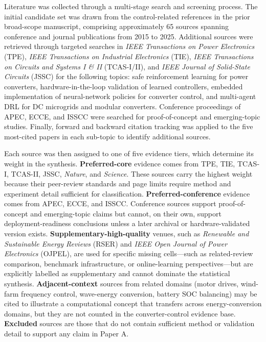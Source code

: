 \documentclass[manuscript,screen,review]{acmart}
\begin{document}
Literature was collected through a multi-stage search and screening process.
The initial candidate set was drawn from the control-related references in the prior broad-scope manuscript, comprising approximately 65 sources spanning conference and journal publications from 2015 to 2025.
Additional sources were retrieved through targeted searches in \emph{IEEE Transactions on Power Electronics} (TPE), \emph{IEEE Transactions on Industrial Electronics} (TIE), \emph{IEEE Transactions on Circuits and Systems I \& II} (TCAS-I/II), and \emph{IEEE Journal of Solid-State Circuits} (JSSC) for the following topics: safe reinforcement learning for power converters, hardware-in-the-loop validation of learned controllers, embedded implementation of neural-network policies for converter control, and multi-agent DRL for DC microgrids and modular converters.
Conference proceedings of APEC, ECCE, and ISSCC were searched for proof-of-concept and emerging-topic studies.
Finally, forward and backward citation tracking was applied to the five most-cited papers in each sub-topic to identify additional sources.

Each source was then assigned to one of five evidence tiers, which determine its weight in the synthesis.
\textbf{Preferred-core} evidence comes from TPE, TIE, TCAS-I, TCAS-II, JSSC, \emph{Nature}, and \emph{Science}.
These sources carry the highest weight because their peer-review standards and page limits require method and experiment detail sufficient for classification.
\textbf{Preferred-conference} evidence comes from APEC, ECCE, and ISSCC.
Conference sources support proof-of-concept and emerging-topic claims but cannot, on their own, support deployment-readiness conclusions unless a later archival or hardware-validated version exists.
\textbf{Supplementary-high-quality} venues, such as \emph{Renewable and Sustainable Energy Reviews} (RSER) and \emph{IEEE Open Journal of Power Electronics} (OJPEL), are used for specific missing cells---such as related-review comparison, benchmark infrastructure, or online-learning perspectives---but are explicitly labelled as supplementary and cannot dominate the statistical synthesis.
\textbf{Adjacent-context} sources from related domains (motor drives, wind-farm frequency control, wave-energy conversion, battery SOC balancing) may be cited to illustrate a computational concept that transfers across energy-conversion domains, but they are not counted in the converter-control evidence base.
\textbf{Excluded} sources are those that do not contain sufficient method or validation detail to support any claim in Paper A.
\end{document}
